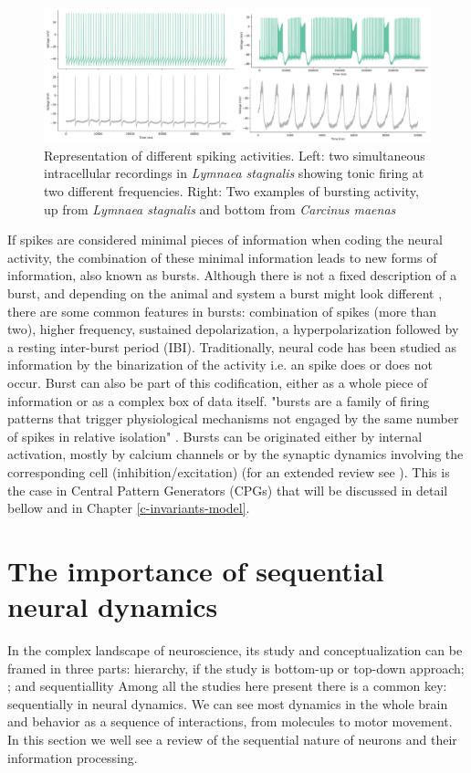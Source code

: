 \begin{figure}[htb!]
    \centering
    \includegraphics[width=\linewidth]{img/intro/spike_activity-types.pdf}
    \caption{Representation of different spiking activities. Left: two simultaneous intracellular recordings in \textit{Lymnaea stagnalis} showing tonic firing at two different frequencies. Right: Two examples of bursting activity, up from \textit{Lymnaea stagnalis} and bottom from \textit{Carcinus maenas}}
    \label{fig:spike_activity-types}
\end{figure}
If spikes are considered minimal pieces of information when coding the neural activity, the combination of these minimal information leads to new forms of information, also known as bursts. Although there is not a fixed description of a burst, and depending on the animal and system a burst might look different \parencite{russell_bursting_1978,palmu_detection_2010,lundqvist_gamma_2016}, there are some common features in bursts: combination of spikes (more than two), higher frequency, sustained depolarization, a hyperpolarization followed by a resting inter-burst period (IBI). Traditionally, neural code has been studied as information by the binarization of the activity i.e. an spike does or does not occur. Burst can also be part of this codification, either as a whole piece of information or as a complex box of data itself. "bursts are a family of firing patterns that trigger physiological mechanisms not engaged by the same number of spikes in relative isolation" \parencite{friedenberger_silences_2023}. Bursts can be originated either by internal activation, mostly by calcium channels or by the synaptic dynamics involving the corresponding cell (inhibition/excitation) (for an extended review see \parencite{friedenberger_silences_2023}). This is the case in Central Pattern Generators (CPGs) \parencite{Katz,steuer_central_2018} that will be discussed in detail bellow and in Chapter \ref{c-invariants-model}.

\section{The importance of sequential neural dynamics}
In the complex landscape of neuroscience, its study and conceptualization can be framed in three parts: hierarchy, if the study is bottom-up or top-down approach; ; and sequentiallity Among all the studies here present there is a common key: sequentially in neural dynamics. We can see most dynamics in the whole brain and behavior as a sequence of interactions, from molecules to motor movement. In this section we well see a review of the sequential nature of neurons and their information processing.

